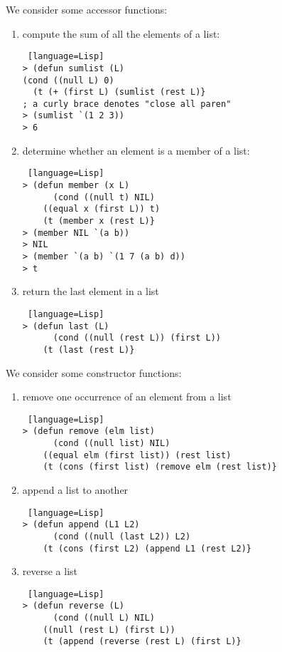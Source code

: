 \documentclass[../../lecture_notes.tex]{subfiles}
\begin{document}
\noindent We consider some accessor functions:
\begin{enumerate}
\item compute the sum of all the elements of a list:
\begin{lstlisting} [language=Lisp]
> (defun sumlist (L)
(cond ((null L) 0)
  (t (+ (first L) (sumlist (rest L)}
; a curly brace denotes "close all paren"
> (sumlist `(1 2 3))
> 6
\end{lstlisting}
\item determine whether an element is a member of a list:
\begin{lstlisting} [language=Lisp]
> (defun member (x L)
      (cond ((null t) NIL)
	((equal x (first L)) t)
	(t (member x (rest L)}
> (member NIL `(a b))
> NIL
> (member `(a b) `(1 7 (a b) d))
> t
\end{lstlisting}
\item return the last element in a list
\begin{lstlisting} [language=Lisp]
> (defun last (L)
      (cond ((null (rest L)) (first L))
	(t (last (rest L)}
\end{lstlisting} \medskip
\end{enumerate} 

\noindent We consider some constructor functions:
\begin{enumerate}
\item remove one occurrence of an element from a list 
\begin{lstlisting} [language=Lisp]
> (defun remove (elm list)
      (cond ((null list) NIL)
	((equal elm (first list)) (rest list)
	(t (cons (first list) (remove elm (rest list)}
\end{lstlisting}
\item append a list to another
\begin{lstlisting} [language=Lisp]
> (defun append (L1 L2)
      (cond ((null (last L2)) L2)
	(t (cons (first L2) (append L1 (rest L2)}
\end{lstlisting}
\item reverse a list
\begin{lstlisting} [language=Lisp]
> (defun reverse (L)
      (cond ((null L) NIL)
	((null (rest L) (first L))
	(t (append (reverse (rest L) (first L)}
\end{lstlisting}
\end{enumerate}
\end{document}
